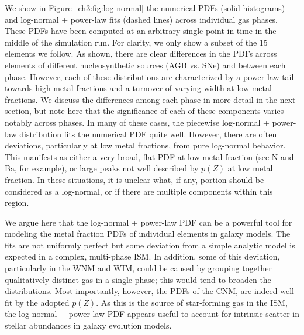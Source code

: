 We show in Figure~\ref{ch3:fig:log-normal} the numerical PDFs (solid histograms) and log-normal + power-law fits (dashed lines) across individual gas phases. These PDFs have been computed at an arbitrary single point in time in the middle of the simulation run.
For clarity, we only show a subset of the 15 elements we follow. As shown, there are clear differences in the PDFs across elements of different nucleosynthetic sources (AGB vs. SNe) and between each phase. However, each of these distributions are characterized by a power-law tail towards high metal fractions and a turnover of varying width at low metal fractions. We discuss the differences among each phase in more detail in the next section, but note here that the significance of each of these components varies notably across phases. In many of these cases, the piecewise log-normal + power-law distribution fits the numerical PDF quite well. However, there are often deviations, particularly at low metal fractions, from pure log-normal behavior. This manifests as either a very broad, flat PDF at low metal fraction (see N and Ba, for example), or large peaks not well described by $p(Z)$ at low metal fraction. In these situations, it is unclear what, if any, portion should be considered as a log-normal, or if there are multiple components within this region.

We argue here that the log-normal + power-law PDF can be a powerful tool for modeling the metal fraction  PDFs of individual elements in galaxy models. The fits are not uniformly perfect but some deviation from a simple analytic model is expected in a complex, multi-phase ISM. In addition, some of this deviation, particularly in the WNM and WIM, could be caused by grouping together qualitatively distinct gas in a single phase; this would tend to broaden the distributions. Most importantly, however, the PDFs of the CNM, are indeed well fit by the adopted $p(Z)$. As this is the source of star-forming gas in the ISM, the log-normal + power-law PDF appears useful to account for intrinsic scatter in stellar abundances in galaxy evolution models.

